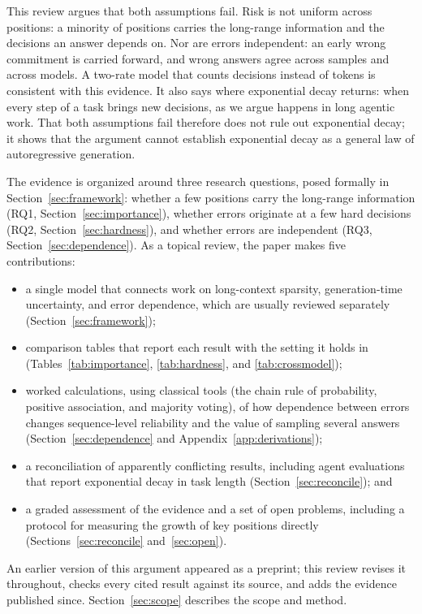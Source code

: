 \documentclass{ieeeaccess}
\begin{document}
This review argues that both assumptions fail. Risk is not uniform across positions: a minority of positions carries the long-range information and the decisions an answer depends on. Nor are errors independent: an early wrong commitment is carried forward, and wrong answers agree across samples and across models. A two-rate model that counts decisions instead of tokens is consistent with this evidence. It also says where exponential decay returns: when every step of a task brings new decisions, as we argue happens in long agentic work. That both assumptions fail therefore does not rule out exponential decay; it shows that the argument cannot establish exponential decay as a general law of autoregressive generation.

The evidence is organized around three research questions, posed formally in Section~\ref{sec:framework}: whether a few positions carry the long-range information (RQ1, Section~\ref{sec:importance}), whether errors originate at a few hard decisions (RQ2, Section~\ref{sec:hardness}), and whether errors are independent (RQ3, Section~\ref{sec:dependence}). As a topical review, the paper makes five contributions:
\begin{itemize}
\item a single model that connects work on long-context sparsity, generation-time uncertainty, and error dependence, which are usually reviewed separately (Section~\ref{sec:framework});
\item comparison tables that report each result with the setting it holds in (Tables~\ref{tab:importance}, \ref{tab:hardness}, and \ref{tab:crossmodel});
\item worked calculations, using classical tools (the chain rule of probability, positive association, and majority voting), of how dependence between errors changes sequence-level reliability and the value of sampling several answers (Section~\ref{sec:dependence} and Appendix~\ref{app:derivations});
\item a reconciliation of apparently conflicting results, including agent evaluations that report exponential decay in task length (Section~\ref{sec:reconcile}); and
\item a graded assessment of the evidence and a set of open problems, including a protocol for measuring the growth of key positions directly (Sections~\ref{sec:reconcile} and~\ref{sec:open}).
\end{itemize}
An earlier version of this argument appeared as a preprint; this review revises it throughout, checks every cited result against its source, and adds the evidence published since. Section~\ref{sec:scope} describes the scope and method.
\end{document}
